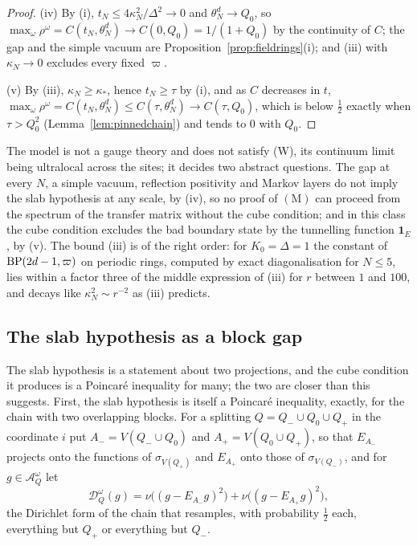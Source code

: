\begin{proof}
(iv) By (i), $t_N\le4\kappa_N^2/\Delta^2\to0$ and $\theta_N^d\to Q_0$, so
$\max_\omega\rho^\omega=C(t_N,\theta_N^d)\to C(0,Q_0)=1/(1+Q_0)$ by the
continuity of $C$; the gap and the simple vacuum are
Proposition~\ref{prop:fieldrings}(i); and (iii) with $\kappa_N\to0$ excludes
every fixed $\varpi$.

(v) By (iii), $\kappa_N\ge\kappa_*$, hence $t_N\ge\tau$ by (i), and as $C$
decreases in $t$, $\max_\omega\rho^\omega=C(t_N,\theta_N^d)\le C(\tau,\theta_N
^d)\to C(\tau,Q_0)$, which is below $\frac12$ exactly when $\tau>Q_0^2$
(Lemma~\ref{lem:pinnedchain}) and tends to $0$ with $Q_0$.
\end{proof}

The model is not a gauge theory and does not satisfy (W), its continuum
limit being ultralocal across the sites; it decides two abstract
questions. The gap at every $N$, a simple vacuum, reflection positivity and
Markov layers do not imply the slab hypothesis at any scale, by (iv), so no
proof of $(\mathrm M)$ can proceed from the spectrum of the transfer matrix
without the cube condition; and in this class the cube condition excludes
the bad boundary state by the tunnelling function $\mathbf 1_E$, by (v). The
bound (iii) is of the right order: for $K_0=\Delta=1$ the constant of
$\mathrm{BP}(2d-1,\varpi)$ on periodic rings, computed by exact diagonalisation for
$N\le5$, lies within a factor three of the middle expression of (iii) for
$r$ between $1$ and $100$, and decays like $\kappa_N^2\sim r^{-2}$ as (iii)
predicts.

\subsection{The slab hypothesis as a block gap}\label{ssec:blockgap}

The slab hypothesis is a statement about two projections, and the cube
condition it produces is a Poincar\'e inequality for many; the two are
closer than this suggests. First, the slab hypothesis is itself a
Poincar\'e inequality, exactly, for the chain with two overlapping blocks.
For a splitting $Q=Q_-\cup Q_0\cup Q_+$ in the coordinate $i$ put $A_-=
V(Q_-\cup Q_0)$ and $A_+=V(Q_0\cup Q_+)$, so that $E_{A_-}$ projects onto
the functions of $\sigma_{V(Q_+)}$ and $E_{A_+}$ onto those of
$\sigma_{V(Q_-)}$, and for $g\in\mathcal A^\omega_Q$ let
\[
\mathcal D^\omega_Q(g)=\nu\bigl((g-E_{A_-}g)^2\bigr)+\nu\bigl((g-E_{A_+}g)^2
\bigr),
\]
the Dirichlet form of the chain that resamples, with probability $\frac12$
each, everything but $Q_+$ or everything but $Q_-$.

